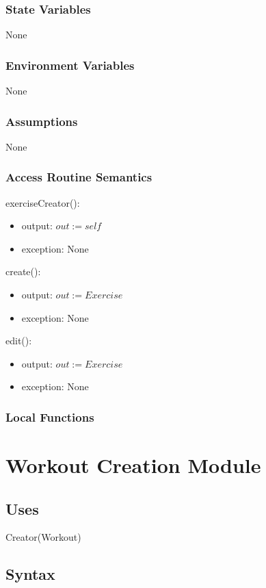 \documentclass[12pt, titlepage]{article}
\begin{document}
\subsubsection{State Variables}
None
\subsubsection{Environment Variables}
None
\subsubsection{Assumptions}
None
\subsubsection{Access Routine Semantics}

\noindent exerciseCreator():
\begin{itemize}
	\item output: $out := self$
	\item exception: None
\end{itemize}

\noindent create():
\begin{itemize}
	\item output: $out := Exercise$
	\item exception: None
\end{itemize}

\noindent edit():
\begin{itemize}
	\item output: $out := Exercise$
	\item exception: None
\end{itemize}

\subsubsection{Local Functions}

\newpage

\section{Workout Creation Module}

\subsection{Uses}

Creator(Workout)

\subsection{Syntax}
\end{document}
